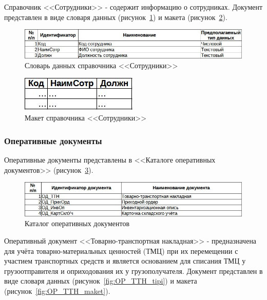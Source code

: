 \documentclass[12pt, a4paper, simple]{eskdtext}
\begin{document}
    Справочник <<Сотрудники>> - содержит информацию о сотрудниках.
    Документ представлен в виде словаря данных (рисунок~\ref{fig:CP_Sotr_tipi})
    и макета (рисунок~\ref{fig:CP_Sotr_maket}).

    \begin{figure}[!h]
        \centering
        \includegraphics[width=14cm]
            {_docs/СП_Сотр_типы.jpg}
        \caption{Словарь данных справочника <<Сотрудники>>}
        \label{fig:CP_Sotr_tipi}
    \end{figure}

    \begin{figure}[!h]
        \centering
        \includegraphics[]
            {_docs/СП_Сотр_макет.jpg}
        \caption{Макет справочника <<Сотрудники>>}
        \label{fig:CP_Sotr_maket}
    \end{figure}

    \subsubsection{Оперативные документы}

    Оперативные документы представлены в <<Каталоге оперативных документов>> (рисунок~\ref{fig:OP_}).
    
    \begin{figure}[!h]
        \centering
        \includegraphics[width=14cm]
            {_docs/ОП_.jpg}
        \caption{Каталог оперативных документов}
        \label{fig:OP_}
    \end{figure}

    \newpage

    Оперативный документ <<Товарно-транспортная накладная>> - предназначена для учёта
    товарно-материальных ценностей (ТМЦ) при их перемещении с участием транспортных средств
    и является основанием для списания ТМЦ у грузоотправителя и оприходования их у грузополучателя.
    Документ представлен в виде словаря данных (рисунок~\ref{fig:OP_TTH_tipi})
    и макета (рисунок~\ref{fig:OP_TTH_maket}).
\end{document}
